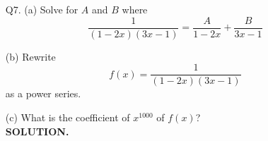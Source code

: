\documentclass[a4paper,12pt]{article}
\begin{document}
\begin{enumerate}
(c) What is the coefficient of $x^{1001}$?

{\bf SOLUTION.}





\newpage
\item[Q7.]
(a) Solve for $A$ and $B$ where
\[
\frac{1}{(1 - 2x)(3x - 1)} = \frac{A}{1 - 2x} + \frac{B}{3x - 1}
\]

(b) Rewrite 
\[
f(x) = \frac{1}{(1 - 2x)(3x - 1)} 
\]
as a power series.

(c) What is the coefficient of $x^{1000}$ of $f(x)$?
\\

{\bf SOLUTION.}




\end{enumerate}
	
\end{document}
